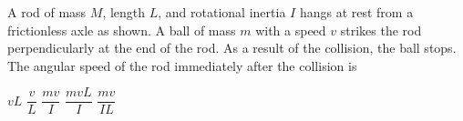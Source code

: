 \documentclass{../../oss-apphys-exam}
\begin{document}
\begin{multicols*}{2}
\begin{questions}
    \question A rod of mass $M$, length $L$, and rotational inertia $I$ hangs
    at rest from a frictionless axle as shown. A ball of mass $m$ with a speed
    $v$ strikes the rod perpendicularly at the end of the rod. As a result
    of the collision, the ball stops. The angular speed of the rod immediately
    after the collision is
    \begin{center}
    \end{center}
    \begin{choices}
      \choice $vL$
      \choice $\dfrac vL$
      \choice $\dfrac{mv}I$
      \choice $\dfrac{mv L}I$
      \choice $\dfrac{mv}{IL}$
    \end{choices}
    \columnbreak
    
    

\end{questions}
\end{multicols*}
\end{document}
